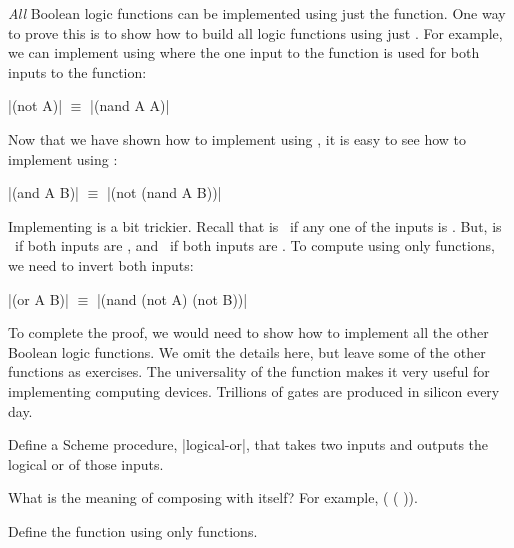 \begin{schemeregion}
\emph{All} Boolean logic functions can be implemented using just the  function.  One way to prove this is to show how to build all logic functions using just .  For example, we can implement  using  where the one input to the  function is used for both inputs to the  function: 
\begin{center}
\scheme|(not A)| $\equiv$ \scheme|(nand A A)|
\end{center}
Now that we have shown how to implement  using , it is easy to see how to implement  using :
\begin{center}
\scheme|(and A B)| $\equiv$ \scheme|(not (nand A B))|
\end{center}

Implementing  is a bit trickier.  Recall that    is \true\ if any one of the inputs is \true.  But,    is \true\ if both inputs are \false, and \false\ if both inputs are \true.  To compute  using only  functions, we need to invert both inputs:
\begin{center}
\scheme|(or A B)| $\equiv$ \scheme|(nand (not A) (not B))|
\end{center}

To complete the proof, we would need to show how to implement all the other Boolean logic functions.  We omit the details here, but leave some of the other functions as exercises.  The universality of the  function makes it very useful for implementing computing devices.  Trillions of  gates are produced in silicon every day.

\beforeex
\begin{exercise}
Define a Scheme procedure, \scheme|logical-or|, that takes two inputs and outputs the logical or of those inputs.
\solution{\LATER{}}
\end{exercise}
\afterex

\beforeex
\begin{exercise}
What is the meaning of composing  with itself?  For example, ( ( )).
\solution{\LATER{}}
\end{exercise}
\afterex

\beforeex
\begin{exercise}
\bluestar Define the  function using only  functions.
\solution{\LATER{}}
\end{exercise}
\afterex


\end{schemeregion}
